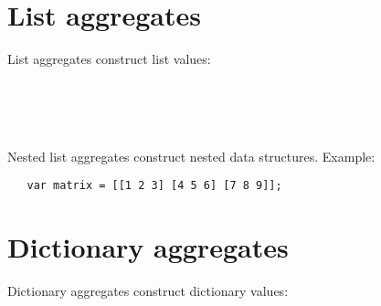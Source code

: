 \section{List aggregates}

List aggregates construct list values:

\begin{grammar}
      \produces \lextoken{\leftbracketSY} \lextoken{\rightbracketSY} \\
      \produces \lextoken{\leftbracketSY}
          \lextoken{\rightbracketSY} \\
      \produces {} \\
      \produces {} \lextoken{,}
\end{grammar}

\noindent
Nested list aggregates construct nested data structures. Example:

\begin{lstlisting}
   var matrix = [[1 2 3] [4 5 6] [7 8 9]];
\end{lstlisting}

\section{Dictionary aggregates}

Dictionary aggregates construct dictionary values:

\begin{grammar}
      \produces \lextoken{\{} \lextoken{\}} \\
      \produces \lextoken{\{}  \lextoken{\}} \\
      \produces \lextoken{\{} 
         \lextoken{,} \lextoken{\}} \\
      \produces {} \\
      \produces {} \lextoken{,}
          \\
      \produces {} \lextoken{->}
\end{grammar}


